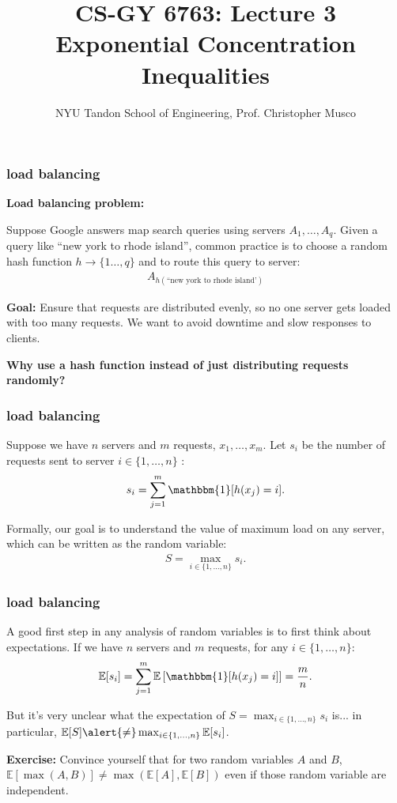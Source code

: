 \documentclass[compress]{beamer}
\title{CS-GY 6763: Lecture 3 \\  Exponential Concentration Inequalities}
\author{NYU Tandon School of Engineering, Prof. Christopher Musco}
\date{}
\newcommand{\E}{\mathbb{E}}
\begin{document}
\begin{frame}
	\titlepage 
\end{frame}



\begin{frame}
	\frametitle{load balancing}
	\textbf{Load balancing problem:}
	
	Suppose Google answers map search queries using servers $A_1, \ldots, A_q$. Given a query like ``new york to rhode island'', common practice is to choose a random hash function $h \rightarrow \{1\ldots, q\}$ and to route this query to server:
	\begin{align*}
		A_{h(\text{``new york to rhode island'})}
	\end{align*}

	\textbf{Goal:} Ensure that requests are distributed evenly, so no one server gets loaded with too many requests. We want to avoid  downtime and slow responses to clients. 
	
	\begin{center}
		\alert{\textbf{Why use a hash function instead of just distributing requests randomly?}}
	\end{center}
	

\end{frame}

\begin{frame}
	\frametitle{load balancing}
	Suppose we have $n$ servers and $m$ requests, $x_1,\ldots, x_m$. Let $s_i$ be the number of requests sent to server $i \in \{1,\ldots, n\}$ :
	\begin{align*}
		s_i = \sum_{j=1}^m \mathbbm{1}[h(x_j) = i]. 
	\end{align*}
	
	Formally, our goal is to understand the value of maximum load on any server, which can be written as the random variable:
	\begin{align*}
		S = \max_{i\in \{1,\ldots, n\}} s_i.
	\end{align*}	
\end{frame}

\begin{frame}
	\frametitle{load balancing}
	A good first step in any analysis of random variables is to first think about expectations. 
	If we have $n$ servers and $m$ requests, for any $i\in \{1,\ldots, n\}$:
	\begin{align*}
		\E[s_i] = \sum_{j=1}^m \E\left[\mathbbm{1}[h(x_j) = i]\right] = \frac{m}{n}.
	\end{align*}
	
	But it's very unclear what the expectation of $S = \max_{i\in \{1,\ldots, n\}} s_i$ is... in particular, $\E[S] \alert{\neq} \max_{i\in \{1,\ldots, n\}} \E[s_i]$. 
	
	\textbf{Exercise:} Convince yourself that for two random variables $A$ and $B$, $\E[\max(A,B)] \neq \max(\E[A], \E[B])$ even if those random variable are independent. 
\end{frame}
\end{document}
